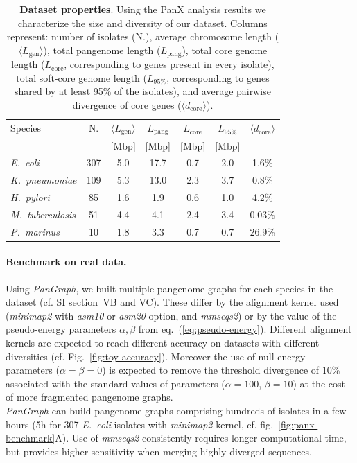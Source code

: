 \documentclass[aps,rmp,preprint,superscriptaddress,10pt,linenumbers]{revtex4-1}
\newcommand{\avg}[1]{\langle #1 \rangle}
\newcommand{\Lcore}{L_\text{core}}
\newcommand{\Lsoftcore}{L_\text{95\%}}
\newcommand{\Lpang}{L_\text{pang}}
\newcommand{\Lgen}{L_\text{gen}}
\newcommand{\dcore}{\langle d_\text{core} \rangle}
\newcommand{\SIdataBenchmark}{V}
\begin{document}
\begin{table}[h]
    \setlength{\tabcolsep}{6pt}
    \begin{tabular}{l c c c c c c}
        \hline\hline
        Species                  & N.  & $\avg{\Lgen}$ & $\Lpang$ & $\Lcore$ & $\Lsoftcore$ & $\dcore$ \\
                                 &     & [Mbp]         & [Mbp]    & [Mbp]    & [Mbp]        &          \\
        \hline
        \textit{E.~coli}         & 307 & 5.0           & 17.7     & 0.7      & 2.0          & 1.6\%    \\
        \textit{K.~pneumoniae}   & 109 & 5.3           & 13.0     & 2.3      & 3.7          & 0.8\%    \\
        \textit{H.~pylori}       & 85  & 1.6           & 1.9      & 0.6      & 1.0          & 4.2\%    \\
        \textit{M.~tuberculosis} & 51  & 4.4           & 4.1      & 2.4      & 3.4          & 0.03\%   \\
        \textit{P.~marinus}      & 10  & 1.8           & 3.3      & 0.7      & 0.7          & 26.9\%   \\
        \hline
    \end{tabular}
    \caption{{\bf Dataset properties}. Using the PanX analysis results we characterize the size and diversity of our dataset. Columns represent:
        number of isolates (N.),
        average chromosome length ($\avg{\Lgen}$),
        total pangenome length ($\Lpang$),
        total core genome length ($\Lcore$, corresponding to genes present in every isolate),
        total soft-core genome length ($\Lsoftcore$, corresponding to genes shared by at least 95\% of the isolates),
        and average pairwise divergence of core genes ($\dcore$).
    }
    \label{table:panx-dataset}
\end{table}

\paragraph*{Benchmark on real data.}
Using \textit{PanGraph}, we built multiple pangenome graphs for each species in the dataset (cf. SI section~{\SIdataBenchmark}B and {\SIdataBenchmark}C). These differ by the alignment kernel used (\textit{minimap2} with \textit{asm10} or \textit{asm20} option, and \textit{mmseqs2}) or by the value of the pseudo-energy parameters $\alpha,\beta$ from eq.~(\ref{eq:pseudo-energy}).
Different alignment kernels are expected to reach different accuracy on datasets with different diversities (cf. Fig.~\ref{fig:toy-accuracy}). Moreover the use of null energy parameters ($\alpha = \beta = 0$) is expected to remove the threshold divergence of 10\% associated with the standard values of parameters ($\alpha=100$, $\beta=10$) at the cost of more fragmented pangenome graphs.\\
\textit{PanGraph} can build pangenome graphs comprising hundreds of isolates in a few hours (5h for 307 \textit{E.~coli} isolates with \textit{minimap2} kernel, cf. fig.~\ref{fig:panx-benchmark}A).
Use of \textit{mmseqs2} consistently requires longer computational time, but provides higher sensitivity when merging highly diverged sequences.
\end{document}
